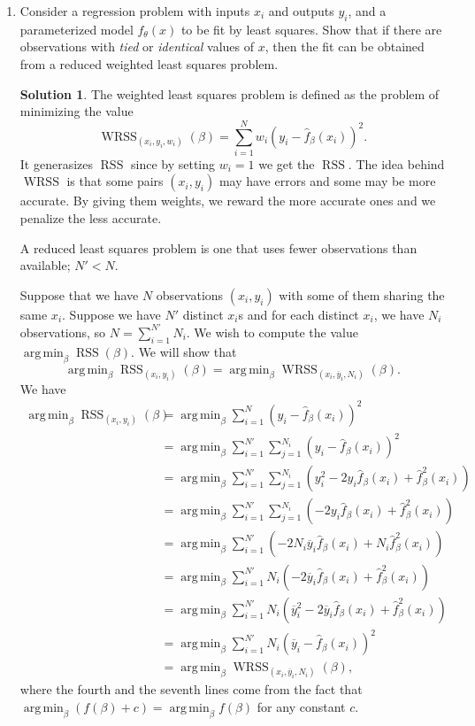 \documentclass[]{book}
\theoremstyle{definition}
\newtheorem*{soln}{Solution}
\DeclareMathOperator*{\argmin}{arg\,min} \DeclareMathOperator*{\Cov}{Cov}
\DeclareMathOperator*{\RSS}{RSS}
\DeclareMathOperator*{\WRSS}{WRSS}
\begin{document}
\begin{enumerate}
	\item\label{ex:2.6} Consider a regression problem with inputs $x_i$ and
	outputs $y_i$, and a parameterized model $f_\theta(x)$ to be fit by least
	squares. Show that if there are observations with \emph{tied} or
	\emph{identical} values of $x$, then the fit can be obtained from a reduced
	weighted least squares problem.

	\begin{soln}
		The weighted least squares problem is defined as the problem of
		minimizing the value
		\[\WRSS\nolimits_{(x_i,y_i,w_i)}(\beta)=\sum_{i=1}^Nw_i(y_i-\hat f_\beta(x_i))^2.\]
		It generasizes $\RSS$ since by setting $w_i=1$ we
		get the $\RSS$. The idea behind $\WRSS$ is that some pairs $(x_i,y_i)$
		may have errors and some may be more accurate. By giving them weights,
		we reward the more accurate ones and we penalize the less accurate.

		A reduced least squares problem is one that uses fewer observations than
		available; $N'<N$.

		Suppose that we have $N$ observations $(x_i,y_i)$ with some of them
		sharing the same $x_i$. Suppose we have $N'$ distinct $x_i$s and for
		each distinct $x_i$, we have $N_i$ observations, so
		$N=\sum_{i=1}^{N'}N_i$. We wish to compute the value
		$\argmin_\beta \RSS(\beta)$. We will show that
		\[\argmin_\beta \RSS\nolimits_{(x_i,y_i)}(\beta)=\argmin_\beta \WRSS\nolimits_{(x_i,\overline y_i,N_i)}(\beta).\]
		We have{
		\newcommand{\fx}{\hat f_\beta(x_i)}
		\newcommand{\fs}{\hat f^2_\beta(x_i)}
		\begin{equation}
			\begin{split}
				\argmin_\beta \RSS\nolimits_{(x_i,y_i)}(\beta) &=
				\argmin_\beta\sum_{i=1}^N(y_i-\fx)^2 \\
				&= \argmin_\beta\sum_{i=1}^{N'}\sum_{j=1}^{N_i}(y_i-\fx)^2 \\
				&= \argmin_\beta\sum_{i=1}^{N'}\sum_{j=1}^{N_i}(y_i^2-2y_i\fx + \fs) \\
				&= \argmin_\beta\sum_{i=1}^{N'}\sum_{j=1}^{N_i}(-2y_i\fx + \fs) \\
				&= \argmin_\beta\sum_{i=1}^{N'}(-2N_i\overline y_i\fx + N_i\fs)\\
				&= \argmin_\beta\sum_{i=1}^{N'}N_i(-2\overline y_i\fx + \fs)\\
				&= \argmin_\beta\sum_{i=1}^{N'}N_i(\overline y_i^2-2\overline y_i\fx + \fs)\\
				&= \argmin_\beta\sum_{i=1}^{N'}N_i(\overline y_i-\fx)^2 \\
				&= \argmin_\beta\WRSS\nolimits_{(x_i,\overline y_i,N_i)}(\beta),
			\end{split}
		\end{equation}}
		where the fourth and the seventh lines come from the fact that
		$\argmin_\beta (f(\beta)+c)=\argmin_\beta{f(\beta)}$ for any constant
		$c$.
	\end{soln}
\end{enumerate}
\end{document}
